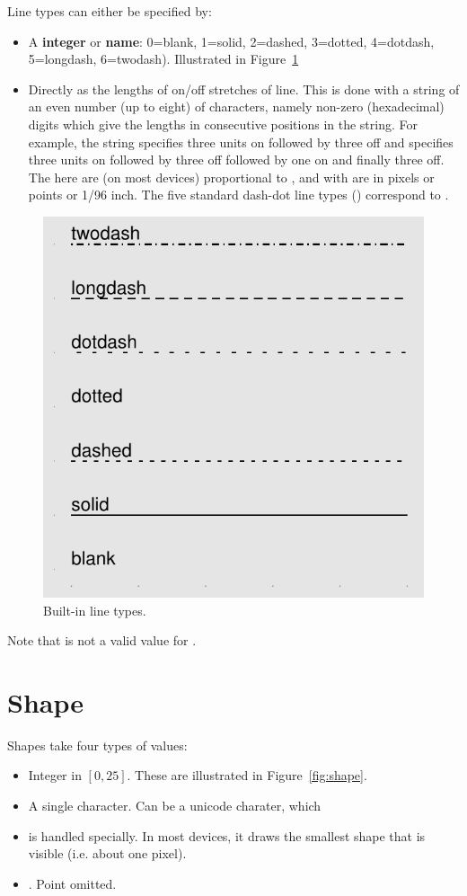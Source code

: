 Line types can either be specified by:

\begin{itemize}
  \item A {\bf integer} or {\bf name}: 0=blank, 1=solid, 2=dashed, 3=dotted, 4=dotdash, 5=longdash, 6=twodash).  Illustrated in Figure~\ref{fig:linetype}

  \item Directly as the lengths of on/off stretches of line. This is done with a string of an even number (up to eight) of characters, namely non-zero (hexadecimal) digits which give the lengths in consecutive positions in the string. For example, the string  specifies three units on followed by three off and  specifies three units on followed by three off followed by one on and finally three off. The  here are (on most devices) proportional to , and with  are in pixels or points or 1/96 inch.
  The five standard dash-dot line types () correspond to .
\end{itemize} 

\begin{figure}[htbp]
  \centering
    \includegraphics[width=0.5 \textwidth]{spec-linetype}
  \caption{Built-in line types.}
  \label{fig:linetype}
\end{figure}

Note that  is not a valid value for .

\section{Shape}
\label{sec:shape_spec}

Shapes take four types of values:

\begin{itemize}
  \item Integer in $[0, 25]$.  These are illustrated in Figure~\ref{fig:shape}.

  \item A single character.  Can be a unicode charater, which 

  \item {} is handled specially. In most devices, it draws the smallest shape that is visible (i.e. about one pixel).
  
  \item {}.  Point omitted.  
\end{itemize}

